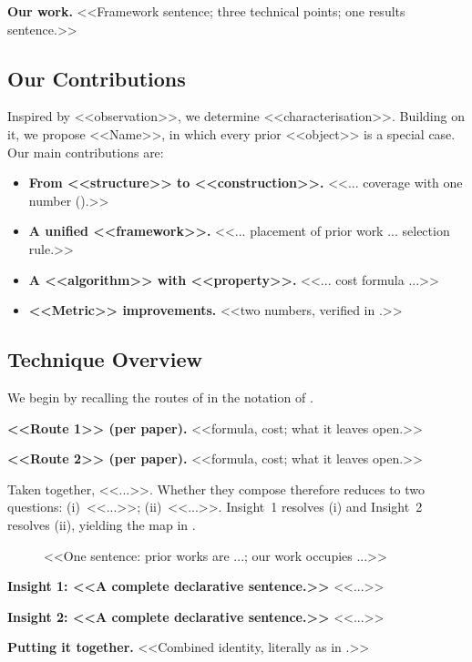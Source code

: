 \noindent\textbf{Our work.} <<Framework sentence; three technical points; one results sentence.>>

\subsection{Our Contributions}\label{sec:contrib}
Inspired by <<observation>>, we determine <<characterisation>>. Building on it, we propose
<<Name>>, in which every prior <<object>> is a special case. Our main contributions are:
\begin{itemize}
\item \textbf{From <<structure>> to <<construction>>.} <<... coverage with one number ().>>
\item \textbf{A unified <<framework>>.} <<... placement of prior work ... selection rule.>>
\item \textbf{A <<algorithm>> with <<property>>.} <<... cost formula ...>>
\item \textbf{<<Metric>> improvements.} <<two numbers, verified in .>>
\end{itemize}

\subsection{Technique Overview}\label{sec:overview}
We begin by recalling the routes of  in the notation of .

\noindent\textbf{<<Route 1>> (per paper).} <<formula, cost; what it leaves open.>>

\noindent\textbf{<<Route 2>> (per paper).} <<formula, cost; what it leaves open.>>

Taken together, <<...>>. Whether they compose therefore reduces to two questions:
(i)~<<...>>; (ii)~<<...>>. Insight~1 resolves (i) and Insight~2 resolves (ii),
yielding the map in .

\begin{figure}[t]
\centering
{}
\caption{<<One sentence: prior works are ...; our work occupies ...>>}
\label{fig:overview}
\end{figure}

\noindent\textbf{Insight 1: <<A complete declarative sentence.>>} <<...>>

\noindent\textbf{Insight 2: <<A complete declarative sentence.>>} <<...>>

\noindent\textbf{Putting it together.} <<Combined identity, literally as in .>>
